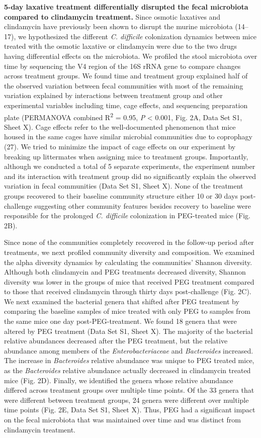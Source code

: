 \documentclass[
  11pt,
]{article}
\begin{document}
\textbf{5-day laxative treatment differentially disrupted the fecal
microbiota compared to clindamycin treatment.} Since osmotic laxatives
and clindamycin have previously been shown to disrupt the murine
microbiota (14--17), we hypothesized the different \emph{C. difficile}
colonization dynamics between mice treated with the osmotic laxative or
clindamycin were due to the two drugs having differential effects on the
microbiota. We profiled the stool microbiota over time by sequencing the
V4 region of the 16S rRNA gene to compare changes across treatment
groups. We found time and treatment group explained half of the observed
variation between fecal communities with most of the remaining variation
explained by interactions between treatment group and other experimental
variables including time, cage effects, and sequencing preparation plate
(PERMANOVA combined R\textsuperscript{2} = 0.95, \emph{P} \textless{}
0.001, Fig. 2A, Data Set S1, Sheet X). Cage effects refer to the
well-documented phenomenon that mice housed in the same cages have
similar microbial communities due to coprophagy (27). We tried to
minimize the impact of cage effects on our experiment by breaking up
littermates when assigning mice to treatment groups. Importantly,
although we conducted a total of 5 separate experiments, the experiment
number and its interaction with treatment group did no significantly
explain the observed variation in fecal communities (Data Set S1, Sheet
X). None of the treatment groups recovered to their baseline community
structure either 10 or 30 days post-challenge suggesting other community
features besides recovery to baseline were responsible for the prolonged
\emph{C. difficile} colonization in PEG-treated mice (Fig. 2B).

Since none of the communities completely recovered in the follow-up
period after treatments, we next profiled community diversity and
composition. We examined the alpha diversity dynamics by calculating the
communities' Shannon diversity. Although both clindamycin and PEG
treatments decreased diversity, Shannon diversity was lower in the
groups of mice that received PEG treatment compared to those that
received clindamycin through thirty days post-challenge (Fig. 2C). We
next examined the bacterial genera that shifted after PEG treatment by
comparing the baseline samples of mice treated with only PEG to samples
from the same mice one day post-PEG-treatment. We found 18 genera that
were altered by PEG treatment (Data Set S1, Sheet X). The majority of
the bacterial relative abundances decreased after the PEG treatment, but
the relative abundance among members of the \emph{Enterobacteriaceae}
and \emph{Bacteroides} increased. The increase in \emph{Bacteroides}
relative abundance was unique to PEG treated mice, as the
\emph{Bacteroides} relative abundance actually decreased in clindamycin
treated mice (Fig. 2D). Finally, we identified the genera whose relative
abundance differed across treatment groups over multiple time points. Of
the 33 genera that were different between treatment groups, 24 genera
were different over multiple time points (Fig. 2E, Data Set S1, Sheet
X). Thus, PEG had a significant impact on the fecal microbiota that was
maintained over time and was distinct from clindamycin treatment.
\end{document}
